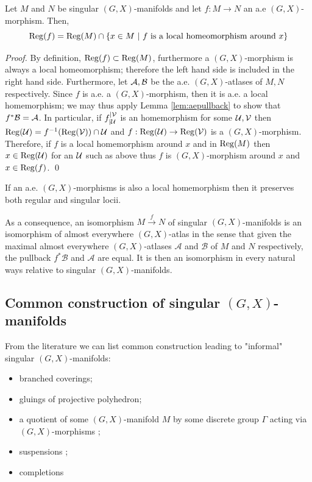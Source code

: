 					
                \begin{lem}{}\label{lem:GX_sing_homeo_reg}
						 Let $M$ and $N$ be singular $(G,X)$-manifolds and let $f:M\rightarrow N$ an a.e $(G,X)$-morphism. Then,
					$$\mathrm{Reg}(f)=\mathrm{Reg}(M)\cap \{x\in M  ~|~ f \text{ is a local homeomorphism around }x\}$$
					\end{lem}
					\begin{proof}
					By definition, $\mathrm{Reg}(f)\subset \mathrm{Reg}(M)$, furthermore a $(G,X)$-morphism is always a local homeomorphism; therefore the left hand side is included in the right hand side. Furthermore, let $\mathcal A,\mathcal B$ be the a.e. $(G,X)$-atlases of $M,N$ respectively. Since $f$ is a.e. a $(G,X)$-morphism, then it is a.e. a local homemorphism; we may thus apply Lemma \ref{lem:aepullback} to show that $f^*\mathcal B = \mathcal A$. In particular, if $f_{|\mathcal{U}}^{|\mathcal V}$ is an homemorphism for some $\mathcal{U},\mathcal V$ then 
					$\mathrm{Reg}(\mathcal{U}) = f^{-1}(\mathrm{Reg}(\mathcal V))\cap \mathcal{U}$ and $f:\mathrm{Reg}(\mathcal{U})\rightarrow \mathrm{Reg}(\mathcal V)$ is a $(G,X)$-morphism. 
					Therefore, if $f$ is a local homemorphism around $x$ and in $\mathrm{Reg}(M)$ then $x\in \mathrm{Reg}(\mathcal{U})$ for an $\mathcal{U}$ such as above thus $f$ is $(G,X)$-morphism around $x$ and $x\in \mathrm{Reg}(f)$.
					\qed\end{proof}


					\begin{cor} If an a.e. $(G,X)$-morphisms  is also a local homemorphism then it preserves both regular and singular locii.
					\end{cor}
					
					\begin{rem} As a consequence, 
					 an isomorphism $M\xrightarrow{f} N$ of singular $(G,X)$-manifolds is an isomorphism of almost everywhere $(G,X)$-atlas in the sense that given the maximal almost everywhere $(G,X)$-atlases $\mathcal A$ and $\mathcal B$ of $M$ and $N$ respectively, the pullback $f^*\mathcal B$ and $\mathcal A$ are equal. It is then an isomorphism in every natural ways relative to singular $(G,X)$-manifolds.
					 
					 
                    \end{rem}

\subsection{Common construction of  singular $(G,X)$-manifolds}
\label{sec:construction_example}

From the literature we can list common construction leading to "informal" singular $(G,X)$-manifolds:
\begin{itemize}

 \item branched coverings;
 \item gluings of projective polyhedron; \cite{MR2127379,MR2170277,Particules_2,brunswic2021cauchy,spinexp}
  \item a quotient of some $(G,X)$-manifold $M$ by some discrete group $\Gamma$ acting via $(G,X)$-morphisms \cite{MR1177168};
 \item suspensions \cite{MR1668340,Particules_1};
 \item completions \cite{brunswic2021cauchy} 
\end{itemize}

